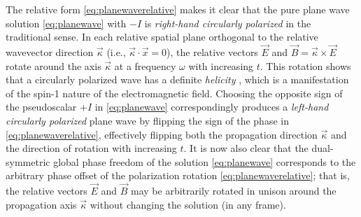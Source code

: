\documentclass[1p,sort&compress]{elsarticle}
\numberwithin{equation}{section}
\newcommand{\rv}[1]{\vec{#1}}
\begin{document}
The relative form \eqref{eq:planewaverelative} makes it clear that the pure plane wave solution \eqref{eq:planewave} with $-I$ is \emph{right-hand circularly polarized} in the traditional sense.  In each relative spatial plane orthogonal to the relative wavevector direction $\rv{\kappa}$ (i.e., $\rv{\kappa}\cdot\rv{x}=0$), the relative vectors $\rv{E}$ and $\rv{B}= \rv{\kappa}\times\rv{E}$ rotate around the axis $\rv{\kappa}$ at a frequency $\omega$ with increasing $t$.  This rotation shows that a circularly polarized wave has a definite \emph{helicity} \cite{Nye1974,Allen1992,Allen1999,Andrews2008,Torres2011,Andrews2013,O'Neil2002,Garces2003,Curtis2003, Zhao2007,Adachi2007,Roy2014,Bliokh2014,Arlt2003,Leach2006,Yeganeh2013,Terborg2013,Dennis2008, Berry2009,Bekshaev2011,Kocsis2011,Dennis2013,Bliokh2013,Bliokh2013a,Barnett2013, Huard1978,Huard1979,Bliokh2012,Bliokh2013b,Bekshaev2014, Tang2010,Hendry2010,Bliokh2011,Tang2011,Hendry2012,Schaferling2012,Canaguier2013,Cameron2012c,Tkachenko2014,Bliokh2013c}, which is a manifestation of the spin-1 nature of the electromagnetic field.  Choosing the opposite sign of the pseudoscalar $+I$ in \eqref{eq:planewave} correspondingly produces a \emph{left-hand circularly polarized} plane wave by flipping the sign of the phase in \eqref{eq:planewaverelative}, effectively flipping both the propagation direction $\rv{\kappa}$ and the direction of rotation with increasing $t$.  It is now also clear that the dual-symmetric global phase freedom of the solution \eqref{eq:planewave} corresponds to the arbitrary phase offset of the polarization rotation \eqref{eq:planewaverelative}; that is, the relative vectors $\rv{E}$ and $\rv{B}$ may be arbitrarily rotated in unison around the propagation axis $\rv{\kappa}$ without changing the solution (in any frame).
\end{document}
